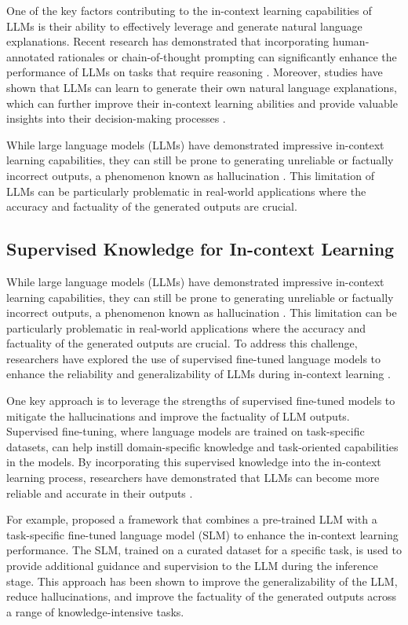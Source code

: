 \documentclass[11pt]{article}
\begin{document}
One of the key factors contributing to the in-context learning capabilities of LLMs is their ability to effectively leverage and generate natural language explanations. Recent research has demonstrated that incorporating human-annotated rationales or chain-of-thought prompting can significantly enhance the performance of LLMs on tasks that require reasoning \cite{ref195}. Moreover, studies have shown that LLMs can learn to generate their own natural language explanations, which can further improve their in-context learning abilities and provide valuable insights into their decision-making processes \cite{ref196}.

While large language models (LLMs) have demonstrated impressive in-context learning capabilities, they can still be prone to generating unreliable or factually incorrect outputs, a phenomenon known as hallucination \cite{ref197}. This limitation of LLMs can be particularly problematic in real-world applications where the accuracy and factuality of the generated outputs are crucial.

\subsection{Supervised Knowledge for In-context Learning}

While large language models (LLMs) have demonstrated impressive in-context learning capabilities, they can still be prone to generating unreliable or factually incorrect outputs, a phenomenon known as hallucination \cite{ref197}. This limitation can be particularly problematic in real-world applications where the accuracy and factuality of the generated outputs are crucial. To address this challenge, researchers have explored the use of supervised fine-tuned language models to enhance the reliability and generalizability of LLMs during in-context learning \cite{ref8}.

One key approach is to leverage the strengths of supervised fine-tuned models to mitigate the hallucinations and improve the factuality of LLM outputs. Supervised fine-tuning, where language models are trained on task-specific datasets, can help instill domain-specific knowledge and task-oriented capabilities in the models. By incorporating this supervised knowledge into the in-context learning process, researchers have demonstrated that LLMs can become more reliable and accurate in their outputs \cite{ref8}.

For example, \cite{ref8} proposed a framework that combines a pre-trained LLM with a task-specific fine-tuned language model (SLM) to enhance the in-context learning performance. The SLM, trained on a curated dataset for a specific task, is used to provide additional guidance and supervision to the LLM during the inference stage. This approach has been shown to improve the generalizability of the LLM, reduce hallucinations, and improve the factuality of the generated outputs across a range of knowledge-intensive tasks.
\end{document}
